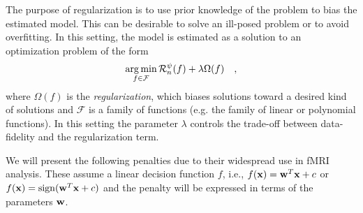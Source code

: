 The purpose of regularization is to use prior knowledge of the problem to bias the estimated model. This can be desirable to solve an ill-posed problem or to avoid overfitting. In this setting, the model is estimated as a solution to an optimization problem of the form
$$
\operatorname*{arg\,min}_{f \in \mathcal{F}} {\mathcal{R}}_n^{\psi}(f) + \lambda \Omega(f) \quad,
$$
where $\Omega(f)$ is the \emph{regularization}, which biases solutions toward a desired kind of solutions and $\mathcal{F}$ is a family of functions (e.g. the family of linear or polynomial functions). In this setting the parameter $\lambda$ controls the trade-off between data-fidelity and the regularization term.

We will present the following penalties due to their widespread use in fMRI analysis. These assume a linear decision function $f$, i.e., $f(\mathbf{x}) = \mathbf{w}^T \mathbf{x} + c$ or $f(\mathbf{x}) = \operatorname*{sign}(\mathbf{w}^T \mathbf{x} + c)$ and the penalty will be expressed in terms of the parameters $\mathbf{w}$.


